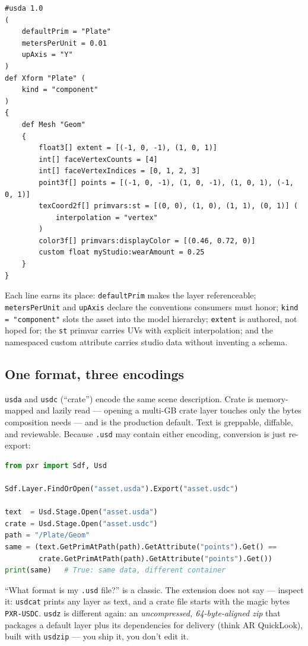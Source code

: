 \begin{lstlisting}
#usda 1.0
(
    defaultPrim = "Plate"
    metersPerUnit = 0.01
    upAxis = "Y"
)
def Xform "Plate" (
    kind = "component"
)
{
    def Mesh "Geom"
    {
        float3[] extent = [(-1, 0, -1), (1, 0, 1)]
        int[] faceVertexCounts = [4]
        int[] faceVertexIndices = [0, 1, 2, 3]
        point3f[] points = [(-1, 0, -1), (1, 0, -1), (1, 0, 1), (-1, 0, 1)]
        texCoord2f[] primvars:st = [(0, 0), (1, 0), (1, 1), (0, 1)] (
            interpolation = "vertex"
        )
        color3f[] primvars:displayColor = [(0.46, 0.72, 0)]
        custom float myStudio:wearAmount = 0.25
    }
}
\end{lstlisting}

\noindent Each line earns its place: \texttt{defaultPrim} makes the layer
referenceable; \texttt{metersPerUnit} and \texttt{upAxis} declare the
conventions consumers must honor; \texttt{kind = "component"} slots the asset
into the model hierarchy; \texttt{extent} is authored, not hoped for; the
\texttt{st} primvar carries UVs with explicit interpolation; and the
namespaced custom attribute carries studio data without inventing a schema.

\subsection{One format, three encodings}\label{sec:de-enc}
\texttt{usda} and \texttt{usdc} (``crate'') encode the same scene
description. Crate is memory-mapped and lazily read --- opening a multi-GB
crate layer touches only the bytes composition needs --- and is the production
default. Text is greppable, diffable, and reviewable. Because \texttt{.usd}
may contain either encoding, conversion is just re-export:

\begin{lstlisting}[language=Python]
from pxr import Sdf, Usd

Sdf.Layer.FindOrOpen("asset.usda").Export("asset.usdc")

text  = Usd.Stage.Open("asset.usda")
crate = Usd.Stage.Open("asset.usdc")
path = "/Plate/Geom"
same = (text.GetPrimAtPath(path).GetAttribute("points").Get() ==
        crate.GetPrimAtPath(path).GetAttribute("points").Get())
print(same)   # True: same data, different container
\end{lstlisting}

\begin{ExamTip}
``What format is my \texttt{.usd} file?'' is a classic. The extension does not
say --- inspect it: \texttt{usdcat} prints any layer as text, and a crate file
starts with the magic bytes \texttt{PXR-USDC}. \texttt{usdz} is different
again: an \emph{uncompressed, 64-byte-aligned zip} that packages a default
layer plus its dependencies for delivery (think AR QuickLook), built with
\texttt{usdzip} --- you ship it, you don't edit it.
\end{ExamTip}

